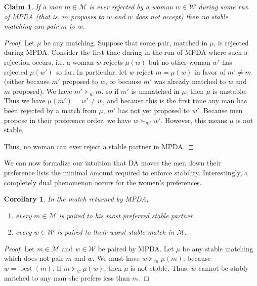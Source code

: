 \documentclass[12pt]{article}
\DeclareMathOperator*{\best}{best}
\newcommand{\M}{\mathcal{M}}
\newcommand{\W}{\mathcal{W}}
\newtheorem{corollary}[definition]{Corollary}
\newtheorem{claim}[definition]{Claim}
\begin{document}
  \begin{claim}\label{claimRejectionUnstable}
    If a man $m\in \M$ is ever rejected by a woman $w\in \W$ during some run
    of MPDA (that is, $m$ proposes to $w$ and $w$ does not accept) then no stable
    matching can pair $m$ to $w$.
  \end{claim}
  \begin{proof}
    Let $\mu$ be any matching.
    Suppose that some pair, matched in $\mu$, is rejected during MPDA.
    Consider the first time during in the run of MPDA where such a rejection
    occurs, i.e. a woman $w$ rejects $\mu(w)$ but no other woman $w'$ has
    rejected $\mu(w')$ so far.
    In particular, let $w$ reject $m=\mu(w)$ in favor of $m'\ne m$
    (either because $m'$ proposed to $w$,
    or because $m'$ was already matched to $w$ and $m$ proposed).
    We have $m'\succ_w m$, so if $m'$ is unmatched in $\mu$, then $\mu$ is
    unstable.
    Thus we have $\mu(m') = w' \ne w$,
    and because this is the first time any man has been rejected by a match from
    $\mu$, $m'$ has not yet proposed to $w'$.
    Because men propose in their preference order, we have $w \succ_{m'} w'$.
    However, this means $\mu$ is not stable.

    Thus, no woman can ever reject a stable partner in MPDA.
  \end{proof}

  We can now formalize our intuition that DA moves the men down their preference
  lists the minimal amount required to enforce stability.
  Interestingly, a completely dual phenomenon occurs for the women's preferences.

  \begin{corollary}\label{claimMenBestStable}\label{claimWomenWorstStable}
    In the match returned by MPDA,
    \begin{enumerate} 
      \item every $m\in \M$ is paired to
        his most preferred stable partner.
      \item every $w\in \W$ is paired to their worst stable
        match in $\M$.
    \end{enumerate} 
  \end{corollary}
  \begin{proof}
    Let $m\in \M$ and $w\in \W$ be paired by MPDA.
    Let $\mu$ be any stable matching which does not pair $m$ and $w$.
    We must have $w \succ_m \mu(m)$, because $w=\best(m)$.
    If $m \succ_w \mu(w)$, then $\mu$ is not stable.
    Thus, $w$ cannot be stably matched to any man she prefers less than $m$.
  \end{proof}
\end{document}
